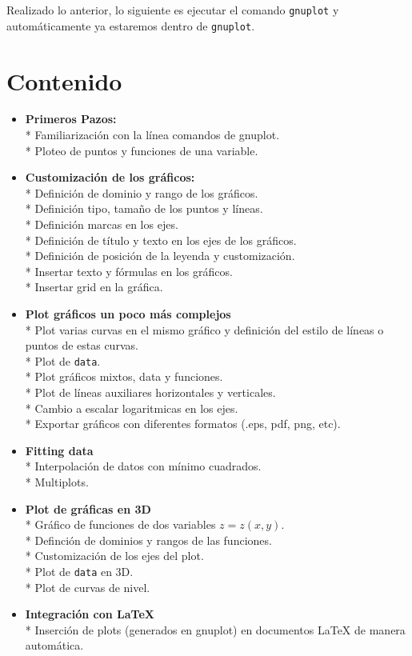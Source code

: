 \documentclass[11.5pt,a4paper]{article}
\begin{document}
Realizado lo anterior, lo siguiente es ejecutar el comando \texttt{gnuplot} y automáticamente ya estaremos dentro de \texttt{gnuplot}.

\section{Contenido}

\begin{itemize}
\item \textbf{Primeros Pazos:}\\* 
Familiarización con la línea comandos de gnuplot.\\*
Ploteo de puntos y funciones de una variable.

\item \textbf{Customización de los gráficos:}\\*
Definición de dominio y rango de los gráficos.\\*
Definición tipo, tamaño de los puntos y líneas.\\*
Definición marcas en los ejes.\\*
Definición de título y texto en los ejes de los gráficos.\\*
Definición de posición de la leyenda y customización.\\*
Insertar texto y fórmulas en los gráficos.\\*
Insertar grid en la gráfica.

\item \textbf{Plot gráficos un poco más complejos}\\*
Plot varias curvas en el mismo gráfico y definición del estilo de líneas o puntos de estas curvas.\\*
Plot de \texttt{data}.\\*
Plot gráficos mixtos, data y funciones.\\*
Plot de líneas auxiliares horizontales y verticales.\\*
Cambio a escalar logaritmicas en los ejes.\\*
Exportar gráficos con diferentes formatos (.eps, pdf, png, etc).

\item \textbf{Fitting data}\\*
Interpolación de datos con mínimo cuadrados.\\*
Multiplots.

\item \textbf{Plot de gráficas en 3D}\\*
Gráfico de funciones de dos variables $z = z(x,y)$.\\*
Definción de dominios y rangos de las funciones.\\*
Customización de los ejes del plot.\\*
Plot de \texttt{data} en 3D.\\*
Plot de curvas de nivel.

\item \textbf{Integración con LaTeX}\\*
Inserción de plots (generados en gnuplot) en documentos LaTeX de manera automática.

\end{itemize}
\end{document}
